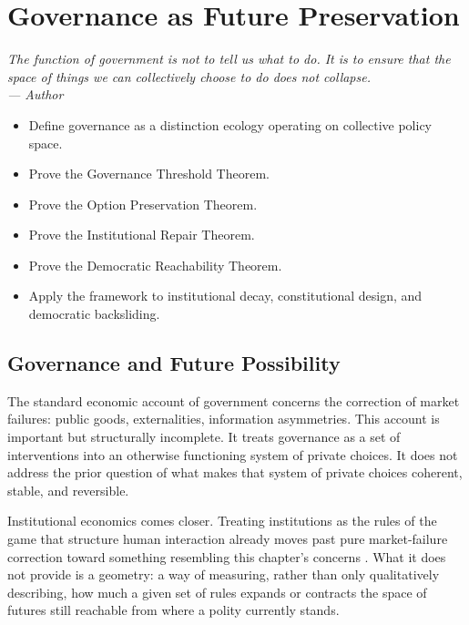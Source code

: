 \documentclass[12pt,twoside,openright]{book}
\newenvironment{epigraph}[2]{%
  \vspace{1em}\begin{flushright}
  \begin{minipage}{0.72\textwidth}
  \itshape\small #1\\[0.4em]
  \upshape\footnotesize\sffamily\color{DistGray}--- #2
  \end{minipage}\end{flushright}\vspace{1.5em}}{}
\newenvironment{objectives}{%
  \begin{tcolorbox}[colback=DistBlue!5,colframe=DistBlue,
    title={\faCheckCircle\enspace Learning Objectives},
    fonttitle=\sffamily\bfseries\color{white},
    attach boxed title to top left={yshift=-2mm,xshift=4mm},
    boxed title style={colback=DistBlue},breakable]
  \begin{itemize}[leftmargin=*,nosep]}{%
  \end{itemize}\end{tcolorbox}\vspace{1em}}
\begin{document}
\chapter{Governance as Future Preservation}
\label{ch:governance}

\begin{epigraph}{%
  The function of government is not to tell us what to do.
  It is to ensure that the space of things we can
  collectively choose to do does not collapse.}%
  {Author}
\end{epigraph}

\begin{objectives}
  \item Define governance as a distinction ecology
        operating on collective policy space.
  \item Prove the Governance Threshold Theorem.
  \item Prove the Option Preservation Theorem.
  \item Prove the Institutional Repair Theorem.
  \item Prove the Democratic Reachability Theorem.
  \item Apply the framework to institutional decay,
        constitutional design, and democratic backsliding.
\end{objectives}

\section{Governance and Future Possibility}

The standard economic account of government concerns
the correction of market failures: public goods,
externalities, information asymmetries. This account
is important but structurally incomplete. It treats
governance as a set of interventions into an otherwise
functioning system of private choices. It does not
address the prior question of what makes that system
of private choices coherent, stable, and reversible.

Institutional economics comes closer. Treating institutions
as the rules of the game that structure human interaction
already moves past pure market-failure correction toward
something resembling this chapter's concerns
\parencite{north1990}. What it does not provide is a
geometry: a way of measuring, rather than only qualitatively
describing, how much a given set of rules expands or
contracts the space of futures still reachable from where a
polity currently stands.
\end{document}
